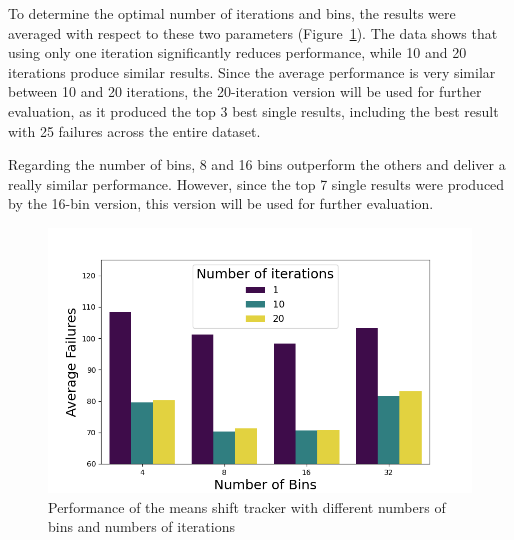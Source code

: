 \documentclass[9pt]{IEEEtran}
\begin{document}
 To determine the optimal number of iterations and bins, the results were averaged with respect to 
  these two parameters (Figure~\ref{fig:params1}). The data shows that using only one iteration 
  significantly reduces performance, while 10 and 20 iterations produce similar results. Since
   the average performance is very similar between 10 and 20 iterations, the 20-iteration version
    will be used for further evaluation, as it produced the top 3 best single results, including 
    the best result with 25 failures across the entire dataset.

    Regarding the number of bins, 8 and 16 bins outperform the others and 
     deliver a really similar performance. 
    However, since the top 7 single results were produced by the 16-bin version, this version will
     be used for further evaluation.


 \begin{figure}[h]
  \centering
  \includegraphics[width=0.95\columnwidth]{figures/nbins_niters.png}
  \caption{Performance of the means shift tracker with different numbers of bins and numbers of
  iterations}
  \label{fig:params1}
\end{figure}
\end{document}
